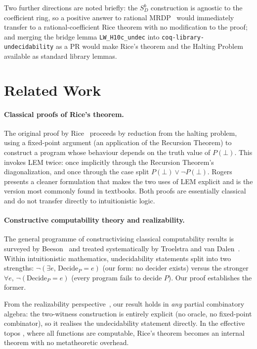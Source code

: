 \documentclass{lmcs}
\begin{document}
Two further directions are noted briefly:
the $S_D^b$ construction is agnostic to the coefficient ring, so a
positive answer to rational MRDP~\cite{mazur1992,koenigsmann2016}
would immediately transfer to a rational-coefficient Rice theorem
with no modification to the proof;
and merging the bridge lemma \texttt{LW\_H10c\_undec} into
\texttt{coq-library-undecidability} as a PR would make Rice's theorem
and the Halting Problem available as standard library lemmas.

\section{Related Work}
\label{sec:related}

\paragraph{Classical proofs of Rice's theorem.}
The original proof by Rice~\cite{rice1953} proceeds by reduction from the
halting problem, using a fixed-point argument (an application of the
Recursion Theorem) to construct a program whose behaviour depends on the
truth value of $P(\bot)$. This invokes LEM twice: once implicitly through
the Recursion Theorem's diagonalization, and once through the case split
$P(\bot) \vee \neg P(\bot)$. Rogers~\cite{rogers1967} presents a cleaner
formulation that makes the two uses of LEM explicit and is the version most
commonly found in textbooks. Both proofs are essentially classical and do
not transfer directly to intuitionistic logic.

\paragraph{Constructive computability theory and realizability.}
The general programme of constructivising classical computability results
is surveyed by Beeson~\cite{beeson1985} and treated systematically by
Troelstra and van Dalen~\cite{troelstra1988}. Within intuitionistic
mathematics, undecidability statements split into two strengths:
$\neg(\exists e,\, \text{Decide}_P = e)$ (our form: no decider exists)
versus the stronger $\forall e,\, \neg(\text{Decide}_P = e)$
(every program fails to decide $P$). Our proof establishes the former.

From the realizability perspective~\cite{bauer2006}, our result holds
in \emph{any} partial combinatory algebra: the two-witness construction
is entirely explicit (no oracle, no fixed-point combinator), so it
realises the undecidability statement directly.  In the effective topos
\cite{hyland1982}, where all functions are computable, Rice's theorem
becomes an internal theorem with no metatheoretic overhead.
\end{document}
